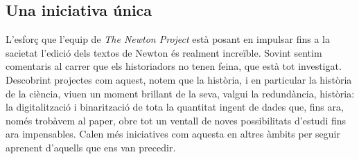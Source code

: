 \documentclass[a4paper, 11pt]{article}
\begin{document}
\subsection*{Una iniciativa única}

L'esforç que l'equip de \textit{The Newton Project} està posant en impulsar fins a la sacietat l'edició dels textos de
Newton és realment increïble. Sovint sentim comentaris al carrer que els historiadors no tenen feina, que està tot
investigat. Descobrint projectes com aquest, notem que la història, i en particular la història de la ciència, viuen un
moment brillant de la seva, valgui la redundància, història: la digitalització i binarització de tota la quantitat
ingent de dades que, fins ara, només trobàvem al paper, obre tot un ventall de noves possibilitats d'estudi fins ara
impensables. Calen més iniciatives com aquesta en altres àmbits per seguir aprenent d'aquells que ens van precedir.

\printbibliography{}
\end{document}
